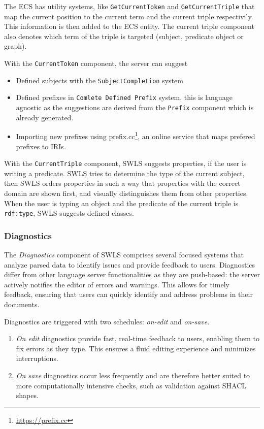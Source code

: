 The ECS has utility systems, like \texttt{GetCurrentToken} and \texttt{GetCurrentTriple} that map the current position to the current term and the current triple respectivily. This information is then added to the ECS entity. The current triple component also denotes which term of the triple is targeted (subject, predicate object or graph).

With the \texttt{CurrentToken} component, the server can suggest
\begin{itemize}
  \item Defined subjects with the \texttt{SubjectCompletion} system
  \item Defined prefixes in \texttt{Comlete Defined Prefix} system, this is language agnostic as the suggestions are derived from the \texttt{Prefix} component which is already generated.
  \item Importing new prefixes using prefix.cc\footnote{\url{https://prefix.cc}}, an online service that maps prefered prefixes to IRIs.
\end{itemize}

With the \texttt{CurrentTriple} component, SWLS suggests properties, if the user is writing a predicate.
SWLS tries to determine the type of the current subject, then SWLS orders properties in such a way that properties with the correct domain are shown first,
and visually distinguishes them from other properties.
When the user is typing an object and the predicate of the current triple is \texttt{rdf:type}, SWLS suggests defined classes.

\subsubsection{Diagnostics}

The \textit{Diagnostics} component of SWLS comprises several focused systems that analyze parsed data to identify issues and provide feedback to users.
Diagnostics differ from other language server functionalities as they are push-based: the server actively notifies the editor of errors and warnings.
This allows for timely feedback, ensuring that users can quickly identify and address problems in their documents.

Diagnostics are triggered with two schedules: \textit{on-edit} and \textit{on-save}.

\begin{enumerate}
  \item \textit{On edit} diagnostics provide fast, real-time feedback to users, enabling them to fix errors as they type. 
    This ensures a fluid editing experience and minimizes interruptions.
  \item \textit{On save} diagnostics occur less frequently and are therefore better suited to more computationally intensive checks,
   such as validation against SHACL shapes.
\end{enumerate}

